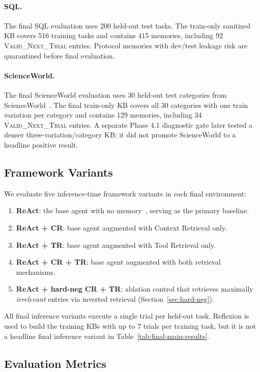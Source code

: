 \paragraph{SQL.}
The final SQL evaluation uses 200 held-out test tasks. The train-only sanitized KB covers 516 training tasks and contains 415 memories, including 92 \textsc{Valid\_Next\_Trial} entries. Protocol memories with dev/test leakage risk are quarantined before final evaluation.

\paragraph{ScienceWorld.}
The final ScienceWorld evaluation uses 30 held-out test categories from ScienceWorld~\citep{wang2022scienceworld}. The final train-only KB covers all 30 categories with one train variation per category and contains 129 memories, including 34 \textsc{Valid\_Next\_Trial} entries. A separate Phase 4.1 diagnostic gate later tested a denser three-variation/category KB; it did not promote ScienceWorld to a headline positive result.

\subsection{Framework Variants}

We evaluate five inference-time framework variants in each final environment:
\begin{enumerate}
    \item \textbf{ReAct}: the base agent with no memory~\citep{yao2023react}, serving as the primary baseline.
    \item \textbf{ReAct + CR}: base agent augmented with Context Retrieval only.
    \item \textbf{ReAct + TR}: base agent augmented with Tool Retrieval only.
    \item \textbf{ReAct + CR + TR}: base agent augmented with both retrieval mechanisms.
    \item \textbf{ReAct + hard-neg CR + TR}: ablation control that retrieves maximally \emph{irrelevant} entries via inverted retrieval (Section~\ref{sec:hard-neg}).
\end{enumerate}
All final inference variants execute a single trial per held-out task. Reflexion is used to build the training KBs with up to 7 trials per training task, but it is not a headline final inference variant in Table~\ref{tab:final-main-results}.

\subsection{Evaluation Metrics}

